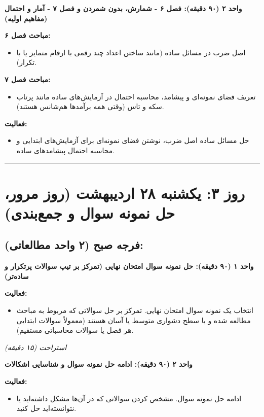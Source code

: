 \documentclass[12pt,a4paper]{article}
\newcommand{\studyunit}[1]{\par\medskip\noindent\textbf{#1}\par\nopagebreak}
\newcommand{\activities}{\par\medskip\noindent\textbf{فعالیت:}\begin{itemize}[nosep,after=\vspace{-0.5\baselineskip}]}
\newcommand{\breaktime}[1]{\par\smallskip\centerline{\textit{#1}}\smallskip}
\begin{document}
    \studyunit{واحد ۲ (۹۰ دقیقه): فصل ۶ - شمارش، بدون شمردن و فصل ۷ - آمار و احتمال (مفاهیم اولیه)}
        \par\medskip\noindent\textbf{مباحث فصل ۶:}
        \begin{itemize}[nosep,after=\vspace{-0.5\baselineskip}]
            \item اصل ضرب در مسائل ساده (مانند ساختن اعداد چند رقمی با ارقام متمایز یا با تکرار).
        \end{itemize}
        \par\medskip\noindent\textbf{مباحث فصل ۷:}
        \begin{itemize}[nosep,after=\vspace{-0.5\baselineskip}]
            \item تعریف فضای نمونه‌ای و پیشامد، محاسبه احتمال در آزمایش‌های ساده مانند پرتاب سکه و تاس (وقتی همه برآمدها هم‌شانس هستند).
        \end{itemize}
        \activities
            \item حل مسائل ساده اصل ضرب، نوشتن فضای نمونه‌ای برای آزمایش‌های ابتدایی و محاسبه احتمال پیشامدهای ساده.
        \end{itemize}

\rule{\linewidth}{0.4pt}\vspace{1em} %

\section*{روز ۳: یکشنبه ۲۸ اردیبهشت (روز مرور، حل نمونه سوال و جمع‌بندی)}

\subsection*{فرجه صبح (۲ واحد مطالعاتی):}
    \studyunit{واحد ۱ (۹۰ دقیقه): حل نمونه سوال امتحان نهایی (تمرکز بر تیپ سوالات پرتکرار و ساده‌تر)}
        \activities
            \item انتخاب یک نمونه سوال امتحان نهایی. تمرکز بر حل سوالاتی که مربوط به مباحث مطالعه شده و با سطح دشواری متوسط یا آسان هستند (معمولاً سوالات ابتدایی هر فصل یا سوالات محاسباتی مستقیم).
        \end{itemize}

    \breaktime{استراحت (۱۵ دقیقه)}

    \studyunit{واحد ۲ (۹۰ دقیقه): ادامه حل نمونه سوال و شناسایی اشکالات}
        \activities
            \item ادامه حل نمونه سوال. مشخص کردن سوالاتی که در آن‌ها مشکل داشته‌اید یا نتوانسته‌اید حل کنید.
        \end{itemize}
\end{document}
